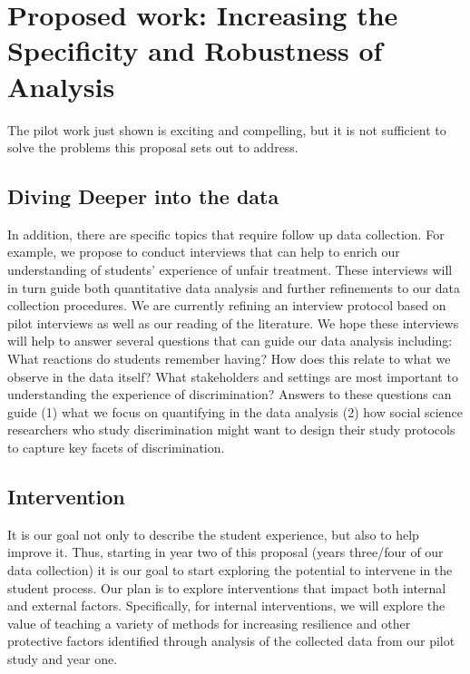 \section{Proposed work: Increasing the Specificity and Robustness of Analysis}
The pilot work just shown is exciting and compelling, but it is not sufficient to solve the problems this proposal sets out to address. 



\subsection{Diving Deeper into the data}
In addition, there are specific topics that require follow up data collection. For example, we propose to conduct interviews that can help to enrich our understanding of students’ experience of unfair treatment. These interviews will in turn guide both quantitative data analysis and further refinements to our data collection procedures. We are currently refining an interview protocol based on pilot interviews as well as our reading of the literature. We hope these interviews will help to answer several questions that can guide our data analysis including:
What reactions do students remember having? How does this relate to what we observe in the data itself? 
What stakeholders and settings are most important to understanding the experience of discrimination? 
Answers to these questions can guide (1) what we focus on quantifying in the data analysis (2) how social science researchers who study discrimination might want to design their study protocols to capture key facets of discrimination.


\subsection{Intervention}
It is our goal not only to describe the student experience, but also to help improve it. Thus, starting in year two of this proposal (years three/four of our data collection) it is our goal to start exploring the potential to intervene in the student process. Our plan is to explore interventions that impact both internal and external factors. Specifically, for internal interventions, we will explore the value of teaching a variety of methods for increasing resilience and other protective factors identified through analysis of the collected data from our pilot study and year one.


